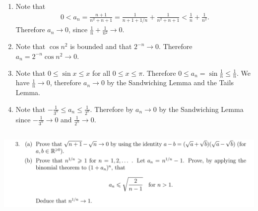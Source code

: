 \documentclass[12pt]{article}
\begin{document}
\begin{enumerate}[label=(\roman*)]
\item Note that
  \begin{align*}
    0 < a_n
    = \frac{n + 1}{n^2 + n + 1}
    = \frac{1}{n + 1 + 1/n} + \frac{1}{n^2 + n + 1}
    < \frac{1}{n} + \frac{1}{n^2}.
  \end{align*}
  Therefore $a_n \to 0$, since $\frac{1}{n} + \frac{1}{n^2} \to 0$.
\item Note that $\cos n^2$ is bounded and that $2^{-n} \to 0$. Therefore
  $a_n = 2^{-n}\cos n^2 \to 0$.
\item Note that $0 \leq \sin x \leq x$ for all $0 \leq x \leq \pi$. Therefore
  $0 \leq a_n = \sin \frac{1}{n} \leq \frac{1}{n}$. We have $\frac{1}{n} \to 0$, therefore
  $a_n \to 0$ by the Sandwiching Lemma and the Tails Lemma.
\item Note that $-\frac{1}{3^n} \leq a_n \leq \frac{1}{2^n}$. Therefore by $a_n \to 0$ by the
  Sandwiching Lemma since $-\frac{1}{3^n} \to 0$ and $\frac{1}{2^n} \to 0$.
\end{enumerate}

\newpage
\subsection{}
\begin{mdframed}
\includegraphics[width=400pt]{img/oxford-M2-analysis-I-3-3.png}
\end{mdframed}
\end{document}
